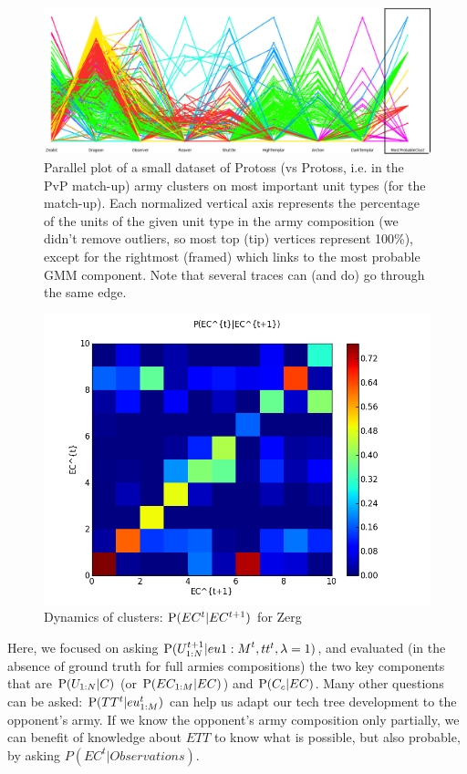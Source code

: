 \begin{figure}[htp]
\centerline{\includegraphics[width=0.7\columnwidth]{images/PvP_small.png}}
\caption{Parallel plot of a small dataset of Protoss (vs Protoss, i.e. in the PvP match-up) army clusters on most important unit types (for the match-up). Each normalized vertical axis represents the percentage of the units of the given unit type in the army composition (we didn't remove outliers, so most top (tip) vertices represent 100\%), except for the rightmost (framed) which links to the most probable GMM component. Note that several traces can (and do) go through the same edge.}
\label{parallelplot}
\end{figure}



\begin{figure}[htp]
\centerline{\includegraphics[width=0.55\columnwidth]{images/Z_EC_knowing_ECnext.png}}
\caption{Dynamics of clusters: $\mathrm{P}(EC^t|EC^{t+1})$ for Zerg}
\label{ecknowingecnext}
\end{figure}

Here, we focused on asking $\mathrm{P}(U_{1:N}^{t+1}|eu{1:M}^t, tt^t, \lambda=1)$, and evaluated (in the absence of ground truth for full armies compositions) the two key components that are $\mathrm{P}(U_{1:N}|C)$ (or $\mathrm{P}(EC_{1:M}|EC)$) and $\mathrm{P}(C_c|EC)$. Many other questions can be asked: $\mathrm{P}(TT^t|eu_{1:M}^t)$ can help us adapt our tech tree development to the opponent's army. If we know the opponent's army composition only partially, we can benefit of knowledge about $ETT$ to know what is possible, but also probable, by asking $P(EC^t|Observations)$.


